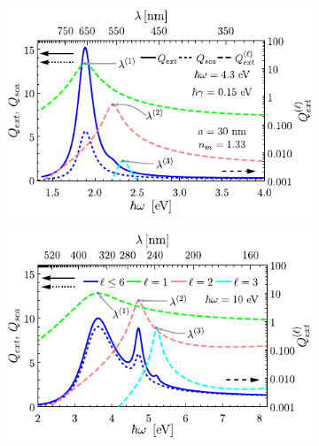 	\begin{figure}[h!]\centering\hspace*{-1.5em}
	\begin{subfigure}{.01\linewidth}\caption{}\label{sfig:Qext4-30}\vspace{3.75cm}\end{subfigure}
	\begin{subfigure}{.45\linewidth}\hspace*{-1.3em}
	\includegraphics[scale=1]{1-Teoria/figs/1-5-Drude4-ExtSca_30.pdf}
	\end{subfigure}\hspace*{.5em}
	\begin{subfigure}{.01\linewidth}\caption{}\label{sfig:Qext10-30}\vspace{3.75cm}\end{subfigure}
	\begin{subfigure}{.45\linewidth}\hspace*{-1em}
	\includegraphics[scale=1]{1-Teoria/figs/1-5-Drude10-ExtSca_30.pdf}

\end{subfigure}
\end{figure}
